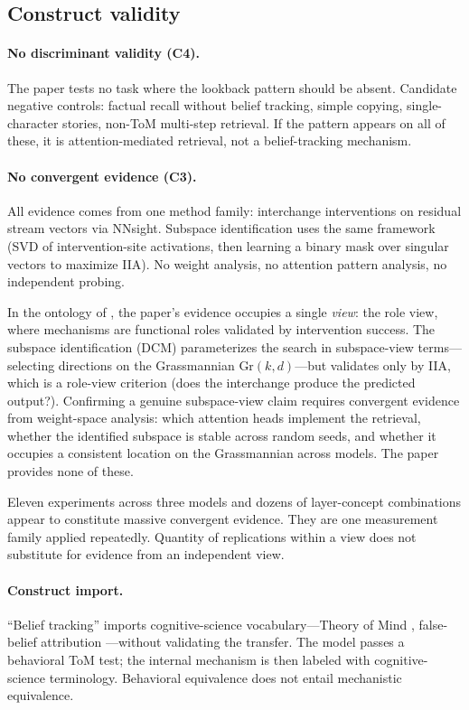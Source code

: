 \documentclass[11pt]{article}
\begin{document}
\subsection{Construct validity}

\paragraph{No discriminant validity (C4).}
The paper tests no task where the lookback pattern should be absent. Candidate negative controls: factual recall without belief tracking, simple copying, single-character stories, non-ToM multi-step retrieval. If the pattern appears on all of these, it is attention-mediated retrieval, not a belief-tracking mechanism.

\paragraph{No convergent evidence (C3).}
All evidence comes from one method family: interchange interventions on residual stream vectors via NNsight. Subspace identification uses the same framework (SVD of intervention-site activations, then learning a binary mask over singular vectors to maximize IIA). No weight analysis, no attention pattern analysis, no independent probing.

In the ontology of \citet{tower2026mechviews}, the paper's evidence occupies a single \emph{view}: the role view, where mechanisms are functional roles validated by intervention success. The subspace identification (DCM) parameterizes the search in subspace-view terms---selecting directions on the Grassmannian $\text{Gr}(k, d)$---but validates only by IIA, which is a role-view criterion (does the interchange produce the predicted output?). Confirming a genuine subspace-view claim requires convergent evidence from weight-space analysis: which attention heads implement the retrieval, whether the identified subspace is stable across random seeds, and whether it occupies a consistent location on the Grassmannian across models. The paper provides none of these.

Eleven experiments across three models and dozens of layer-concept combinations appear to constitute massive convergent evidence. They are one measurement family applied repeatedly. Quantity of replications within a view does not substitute for evidence from an independent view.

\paragraph{Construct import.}
``Belief tracking'' imports cognitive-science vocabulary---Theory of Mind \citep{premack1978chimpanzee}, false-belief attribution \citep{wimmer1983beliefs}---without validating the transfer. The model passes a behavioral ToM test; the internal mechanism is then labeled with cognitive-science terminology. Behavioral equivalence does not entail mechanistic equivalence.
\end{document}
